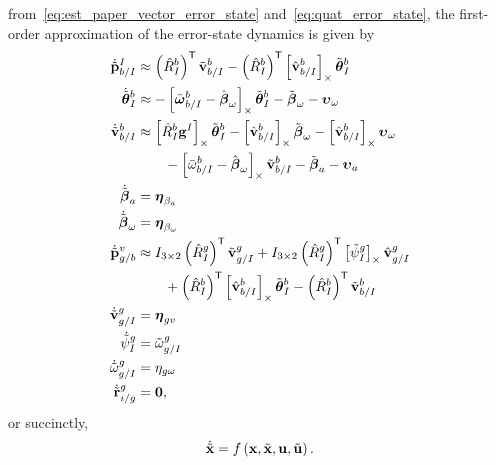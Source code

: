 from~\eqref{eq:est_paper_vector_error_state} and~\eqref{eq:quat_error_state}, the
first-order approximation of the error-state dynamics is given by 
\begin{align}
  \dot{\tilde{\boldsymbol{\mathrm{p}}}}_{b/I}^I
  &\approx
  \left( \hat{R}_I^b \right)^{\mathsf{T}} \tilde{\boldsymbol{\mathrm{v}}}_{b/I}^b
  - \left( \hat{R}_I^b \right)^{\mathsf{T}} \left[ \hat{\boldsymbol{\mathrm{v}}}_{b/I}^b \right]_{\times}
  \tilde{\boldsymbol{\mathrm{\theta}}}_I^b
  \\
  \dot{\tilde{\boldsymbol{\mathrm{\theta}}}}_{I}^{b} 
  &\approx 	
  -\left[  \bar{\boldsymbol{\mathrm{\omega}}}_{b/I}^b - \hat{\boldsymbol{\mathrm{\beta}}}_\omega \right]_{\times}
    \tilde{\boldsymbol{\mathrm{\theta}}}_I^b
    - \tilde{\boldsymbol{\mathrm{\beta}}}_\omega -
    \boldsymbol{\mathrm{\upsilon}}_\omega
  \nonumber \\
  \dot{\tilde{\boldsymbol{\mathrm{v}}}}_{b/I}^b 
  &\approx
  \left[  \hat{R}_I^b \boldsymbol{\mathrm{g}}^I  \right]_{\times} \tilde{\boldsymbol{\mathrm{\theta}}}_I^b 
  -
  \left[  \hat{\boldsymbol{\mathrm{v}}}_{b/I}^b  \right]_{\times} \tilde{\boldsymbol{\mathrm{\beta}}}_\omega
  -
  \left[  \hat{\boldsymbol{\mathrm{v}}}_{b/I}^b  \right]_{\times} \boldsymbol{\mathrm{\upsilon}}_\omega
  \nonumber \\
  & \qquad -
  \left[  \bar{\omega}_{b/I}^b - \hat{\boldsymbol{\mathrm{\beta}}}_\omega  \right]_{\times}
  \tilde{\boldsymbol{\mathrm{v}}}_{b/I}^b
  -
  \tilde{\boldsymbol{\mathrm{\beta}}}_a
  -
  \boldsymbol{\mathrm{\upsilon}}_a \nonumber
  \\
  \dot{\tilde{\boldsymbol{\mathrm{\beta}}}}_a &= \boldsymbol{\mathrm{\eta}}_{\beta_a} \nonumber
  \\
  \dot{\tilde{\boldsymbol{\mathrm{\beta}}}}_\omega &= \boldsymbol{\mathrm{\eta}}_{\beta_\omega} \nonumber
  \\
  \dot{\tilde{\boldsymbol{\mathrm{p}}}}_{g/b}^{v}
                                  &\approx
  I_{3 \times 2} \left( \hat{R}_{I}^{g} \right)^{\mathsf{T}}
  \tilde{\boldsymbol{\mathrm{v}}}_{g/I}^g
  +
  I_{3 \times 2} \left( \hat{R}_{I}^{g} \right)^{\mathsf{T}}
  \left[  \tilde{\psi}_I^g  \right]_{\times} \hat{\boldsymbol{\mathrm{v}}}_{g/I}^g
  \nonumber \\
  & \qquad +
  \left( \hat{R}_{I}^{b} \right)^{\mathsf{T}} \left[  \hat{\boldsymbol{\mathrm{v}}}_{b/I}^{b}  \right]_{\times} 
  \tilde{\boldsymbol{\mathrm{\theta}}}_I^b
  -
  \left( \hat{R}_{I}^{b} \right)^{\mathsf{T}} \tilde{\boldsymbol{\mathrm{v}}}_{b/I}^{b} \nonumber \\
  \dot{\tilde{\boldsymbol{\mathrm{v}}}}_{g/I}^{g} &= \boldsymbol{\mathrm{\eta}}_{gv} \nonumber \\
  \dot{\tilde{\psi}}_{I}^{g} &= \tilde{\omega}_{g/I}^g \nonumber \\
  \dot{\tilde{\omega}}_{g/I}^{g} &= \eta_{g\omega} \nonumber \\
  \dot{\tilde{\boldsymbol{\mathrm{r}}}}_{i/g}^g &= \boldsymbol{\mathrm{0}}, \nonumber
\end{align}
or succinctly,
\begin{equation}
  \dot{\tilde{\boldsymbol{\mathrm{x}}}} = f\left(\boldsymbol{\mathrm{x}}, \tilde{\boldsymbol{\mathrm{x}}}, \boldsymbol{\mathrm{u}}, \tilde{\boldsymbol{\mathrm{u}}}\right).
\end{equation}
